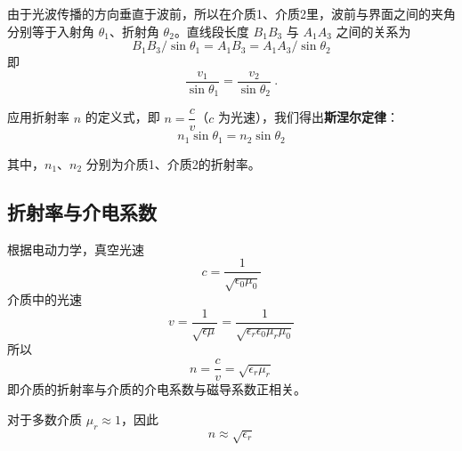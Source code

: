 由于光波传播的方向垂直于波前，所以在介质1、介质2里，波前与界面之间的夹角分别等于入射角 $\theta_1$、折射角 $\theta_2$。直线段长度 $B_{1}B_{3}$ 与 $A_{1}A_{3}$ 之间的关系为
\begin{equation}
B_{1}B_{3}/\sin \theta _{1}=A_{1}B_{3}=A_{1}A_{3}/\sin \theta _{2}
\end{equation}
即
\begin{equation}
{\frac  {v_{1}}{\sin \theta _{1}}}={\frac  {v_{2}}{\sin \theta _{2}}}~.
\end{equation}

应用折射率 $n$ 的定义式，即 $n {=}\dfrac{c}{v}$（$c$ 为光速），我们得出\textbf{斯涅尔定律}：
\begin{equation}
n_1\sin\theta_1=n_2\sin\theta_2
\end{equation}

其中，$n_{1}$、$n_{2}$ 分别为介质1、介质2的折射率。

\subsection{折射率与介电系数}
根据电动力学，真空光速 
\begin{equation}
c=\frac{1}{\sqrt{\epsilon_0 \mu_0}}
\end{equation}
介质中的光速 
\begin{equation}
v=\frac{1}{\sqrt{\epsilon\mu}}=\frac{1}{\sqrt{\epsilon_r \epsilon_0 \mu_r \mu_0}}
\end{equation}
所以
\begin{equation}
n=\frac{c}{v}=\sqrt{\epsilon_r \mu_r}
\end{equation}
即介质的折射率与介质的介电系数与磁导系数正相关。\cite{GriffE}

对于多数介质 $\mu_r \approx 1$，因此
\begin{equation}
n \approx \sqrt{\epsilon_r}
\end{equation}
